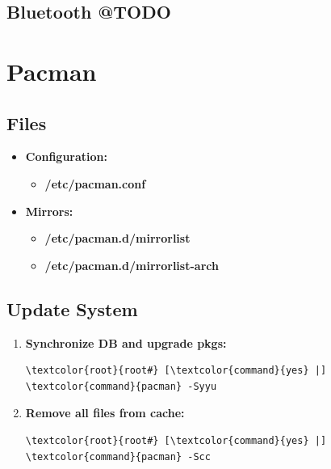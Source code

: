 \documentclass[10pt, a4paper, onecolumn, oneside, titlepage, openany]{book}
\begin{document}
\section{Bluetooth @TODO}


\chapter{Pacman}
\section{Files}
\begin{itemize}
    \item \textbf{Configuration:}
    \begin{itemize}
        \item \textbf{\textcolor{file}{/etc/pacman.conf}}
    \end{itemize}
    \item \textbf{Mirrors:}
    \begin{itemize}
        \item \textbf{\textcolor{file}{/etc/pacman.d/mirrorlist}} 
        \item \textbf{\textcolor{file}{/etc/pacman.d/mirrorlist-arch}}
    \end{itemize}
\end{itemize}
\section{Update System}
\begin{enumerate}
    \item \textbf{Synchronize DB and upgrade pkgs:}
\begin{Verbatim}[commandchars=\\\{\}]
\textcolor{root}{root#} [\textcolor{command}{yes} |] \textcolor{command}{pacman} -Syyu
\end{Verbatim}
    \item \textbf{Remove all files from cache:}
\begin{Verbatim}[commandchars=\\\{\}]
\textcolor{root}{root#} [\textcolor{command}{yes} |] \textcolor{command}{pacman} -Scc
\end{Verbatim}
\end{enumerate}
\end{document}
